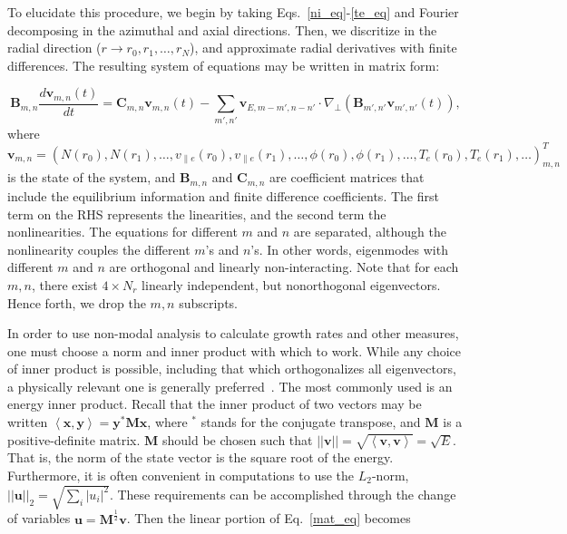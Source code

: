 \documentclass[showpacs,preprintnumbers,amsmath,amssymb,superscriptaddress,aip]{revtex4-1}
\def\beq{\begin{equation}}
\def\eeq{\end{equation}}
\newcommand{\diff}[2]{\frac{d#1}{d#2}}
\def\grad{\nabla}
\newcommand{\gradperp}{\grad_\perp}
\newcommand{\vpe}{v_{\parallel e}}
\begin{document}
To elucidate this procedure, we begin by taking Eqs.~\ref{ni_eq}-\ref{te_eq} and Fourier decomposing in the azimuthal and axial directions.
Then, we discritize in the radial direction ($r \rightarrow r_0, r_1, \ldots, r_N $), and approximate radial derivatives with finite differences. 
The resulting system of equations may be written in matrix form:

\beq
\label{mat_eq}
\mathbf{B}_{m,n} \diff{\mathbf{v}_{m,n}(t)}{t} = \mathbf{C}_{m,n} \mathbf{v}_{m,n}(t) - \sum_{m',n'}  \mathbf{v}_{E,m-m',n-n'} \cdot \gradperp \left( \mathbf{B}_{m',n'} \mathbf{v}_{m',n'}(t) \right),
\eeq
where $\mathbf{v}_{m,n} = \left( N(r_0), N(r_1), \ldots, \vpe(r_0), \vpe(r_1), \ldots, \phi(r_0), \phi(r_1), \ldots, T_e(r_0), T_e(r_1), \ldots \right)_{m,n}^{T}$ is the state of the system,
and $\mathbf{B}_{m,n}$ and $\mathbf{C}_{m,n}$ are coefficient matrices that include the equilibrium information and finite difference coefficients. The first term on the RHS represents the linearities,
and the second term the nonlinearities.
The equations for different $m$ and $n$ are separated, although the nonlinearity couples the different $m$'s and $n$'s. 
In other words, eigenmodes with different $m$ and $n$ are orthogonal and linearly non-interacting. Note that for each $m,n$, there exist $4 \times N_r$ linearly
independent, but nonorthogonal eigenvectors. Hence forth, we drop the $m,n$ subscripts.

In order to use non-modal analysis to calculate growth rates and other measures, one must choose a norm and inner product with which to work. While any choice of
inner product is possible, including that which orthogonalizes all eigenvectors, a physically relevant one is generally preferred~\cite{camargo1998,schmid2007,camporeale2010}. The most commonly used
is an energy inner product. Recall that the inner product of two vectors may be written $\left< \mathbf{x},\mathbf{y} \right> = \mathbf{y}^{*} \mathbf{M} \mathbf{x}$,
where $^*$ stands for the conjugate transpose, and $\mathbf{M}$ is a positive-definite matrix. $\mathbf{M}$ should be chosen such that 
$||\mathbf{v}|| = \sqrt{\left< \mathbf{v},\mathbf{v} \right>} = \sqrt{E}$. That is, the norm of the state vector is the square root of the energy. Furthermore, it is often convenient in
computations to use the $L_2$-norm, $||\mathbf{u}||_2 = \sqrt{\sum_i |u_i|^2}$. These requirements can be accomplished through the change of variables $\mathbf{u} = \mathbf{M}^{\frac{1}{2}} \mathbf{v}$.
Then the linear portion of Eq.~\ref{mat_eq} becomes
\end{document}
